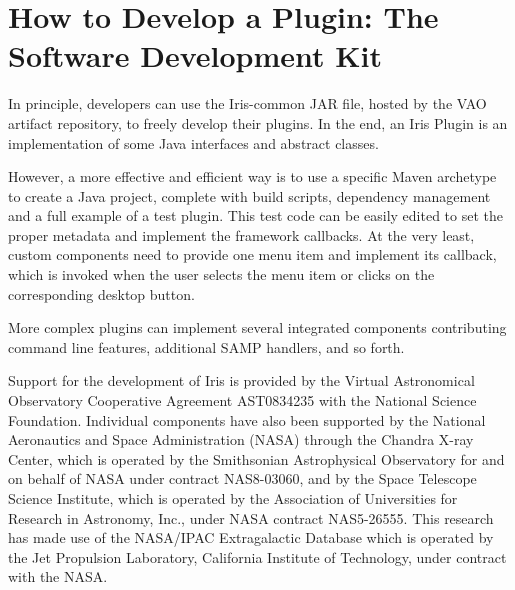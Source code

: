 \section{How to Develop a Plugin: The Software Development Kit}
In principle, developers can use the Iris-common JAR file, hosted by the VAO artifact repository, to freely develop their plugins. In the end, an Iris Plugin is an implementation of some Java interfaces and abstract classes.

However, a more effective and efficient way is to use a specific Maven archetype to create a Java project, complete with build scripts, dependency management and a full example of a test plugin. This test code can be easily edited to set the proper metadata and implement the framework callbacks. At the very least, custom components need to provide one menu item and implement its callback, which is invoked when the user selects the menu item or clicks on the corresponding desktop button.

More complex plugins can implement several integrated components contributing command line features, additional SAMP handlers, and so forth.

\acknowledgements
Support for the development of Iris is provided by the Virtual Astronomical Observatory Cooperative Agreement AST0834235 with the National Science Foundation. Individual components have also been supported by the National Aeronautics and Space Administration (NASA) through the Chandra X-ray Center, which is operated by the Smithsonian Astrophysical Observatory for and on behalf of NASA under contract NAS8-03060,  and by the Space Telescope Science Institute, which is operated by the Association of Universities for Research in Astronomy, Inc., under NASA contract NAS5-26555. This research has made use of the NASA/IPAC Extragalactic Database which is operated by the Jet Propulsion Laboratory, California Institute of Technology, under contract with the NASA.



